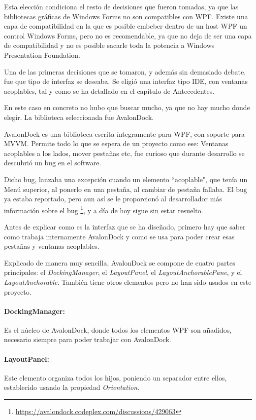 Esta elecci\'on condiciona el resto de decisiones que fueron tomadas, ya que las bibliotecas gr\'aficas
de Windows Forms no son compatibles con WPF. Existe una capa de compatibilidad en la que es posible embeber dentro
de un host WPF un control Windows Forms, pero no es recomendable, ya que no deja de ser una capa de compatibilidad y
no es posible sacarle toda la potencia a Windows Presentation Foundation.

Una de las primeras decisiones que se tomaron, y adem\'as sin demasiado debate, fue que tipo de interfaz se deseaba.
Se eligi\'o una interfaz tipo IDE, con ventanas acoplables, tal y como se ha detallado en el cap\'itulo de Antecedentes.

En este caso en concreto no hubo que buscar mucho, ya que no hay mucho donde elegir. La biblioteca seleccionada
fue AvalonDock.

AvalonDock es una biblioteca escrita \'integramente para WPF, con soporte para MVVM. Permite todo lo que se espera
de un proyecto como ese: Ventanas acoplables a los lados, mover pesta\~nas etc, fue curioso que durante desarrollo se descubri\'o
un bug en el software.

Dicho bug, lanzaba una excepci\'on cuando un elemento ``acoplable", que ten\'ia un Men\'u superior, al ponerlo
en una pesta\~na, al cambiar de pesta\~na fallaba. El bug ya estaba reportado, pero aun as\'i se le proporcion\'o
al desarrollador m\'as informaci\'on sobre el bug \footnote{\url{https://avalondock.codeplex.com/discussions/429063}}, y a d\'ia de hoy
sigue sin estar resuelto.

Antes de explicar como es la interfaz que se ha dise\~nado, primero hay que saber como trabaja internamente
AvalonDock y como se usa para poder crear esas pesta\~nas y ventanas acoplables.

Explicado de manera muy sencilla, AvalonDock se compone de cuatro partes principales: el \emph{DockingManager},
el \emph{LayoutPanel}, el \emph{LayoutAnchorablePane}, y el \emph{LayoutAnchorable}.
Tambi\'en tiene otros elementos pero no han sido usados en este proyecto.

\paragraph{DockingManager:} Es el n\'ucleo de AvalonDock, donde todos los elementos WPF son a\~nadidos, necesario
siempre para poder trabajar con AvalonDock.

\paragraph{LayoutPanel:} Este elemento organiza todos los hijos, poniendo un separador entre ellos, establecido
usando la propiedad \emph{Orientation}.


